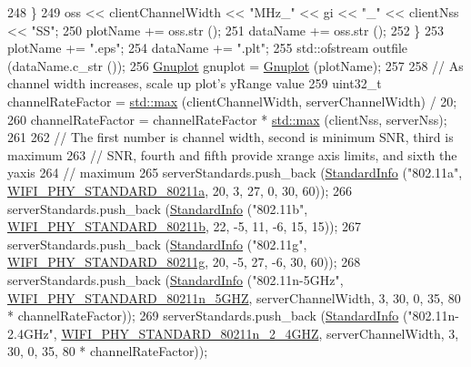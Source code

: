 \begin{DoxyCode}
248         \}
249       oss << clientChannelWidth << \textcolor{stringliteral}{"MHz\_"} << gi << \textcolor{stringliteral}{"\_"} << clientNss << \textcolor{stringliteral}{"SS"};
250       plotName += oss.str ();
251       dataName += oss.str ();
252     \}
253   plotName += \textcolor{stringliteral}{".eps"};
254   dataName += \textcolor{stringliteral}{".plt"};
255   std::ofstream outfile (dataName.c\_str ());
256   \hyperlink{classns3_1_1Gnuplot}{Gnuplot} gnuplot = \hyperlink{classns3_1_1Gnuplot}{Gnuplot} (plotName);
257 
258   \textcolor{comment}{// As channel width increases, scale up plot's yRange value}
259   uint32\_t channelRateFactor = \hyperlink{80211b_8c_affe776513b24d84b39af8ab0930fef7f}{std::max} (clientChannelWidth, serverChannelWidth) / 20;
260   channelRateFactor = channelRateFactor * \hyperlink{80211b_8c_affe776513b24d84b39af8ab0930fef7f}{std::max} (clientNss, serverNss);
261 
262   \textcolor{comment}{// The first number is channel width, second is minimum SNR, third is maximum}
263   \textcolor{comment}{// SNR, fourth and fifth provide xrange axis limits, and sixth the yaxis}
264   \textcolor{comment}{// maximum}
265   serverStandards.push\_back (\hyperlink{structStandardInfo}{StandardInfo} (\textcolor{stringliteral}{"802.11a"}, 
      \hyperlink{group__wifi_gga1299834f4e1c615af3ca738033b76a49a22db1e8022db2c3450414b86c77b11e4}{WIFI\_PHY\_STANDARD\_80211a}, 20, 3, 27, 0, 30, 60));
266   serverStandards.push\_back (\hyperlink{structStandardInfo}{StandardInfo} (\textcolor{stringliteral}{"802.11b"}, 
      \hyperlink{group__wifi_gga1299834f4e1c615af3ca738033b76a49a77e1cc9f77a0bce8e2bc82cbef437b5a}{WIFI\_PHY\_STANDARD\_80211b}, 22, -5, 11, -6, 15, 15));
267   serverStandards.push\_back (\hyperlink{structStandardInfo}{StandardInfo} (\textcolor{stringliteral}{"802.11g"}, 
      \hyperlink{group__wifi_gga1299834f4e1c615af3ca738033b76a49aeda6d90f260393ce003ec4765d8100af}{WIFI\_PHY\_STANDARD\_80211g}, 20, -5, 27, -6, 30, 60));
268   serverStandards.push\_back (\hyperlink{structStandardInfo}{StandardInfo} (\textcolor{stringliteral}{"802.11n-5GHz"}, 
      \hyperlink{group__wifi_gga1299834f4e1c615af3ca738033b76a49aaabe94a0be4668583c42595437b4a6c0}{WIFI\_PHY\_STANDARD\_80211n\_5GHZ}, serverChannelWidth, 3, 30, 0, 35, 80 * 
      channelRateFactor));
269   serverStandards.push\_back (\hyperlink{structStandardInfo}{StandardInfo} (\textcolor{stringliteral}{"802.11n-2.4GHz"}, 
      \hyperlink{group__wifi_gga1299834f4e1c615af3ca738033b76a49a6e449a5ca14fc7c0eb36064ce04a5192}{WIFI\_PHY\_STANDARD\_80211n\_2\_4GHZ}, serverChannelWidth, 3, 30, 0, 35, 80 * 
      channelRateFactor));

\end{DoxyCode}
